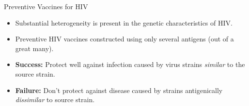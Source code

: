\documentclass[12pt,t,handout]{beamer}
\begin{document}
\begin{frame}[c]{Preventive Vaccines for HIV}

\begin{center}
\begin{itemize}
  \itemsep10pt
  \item Substantial heterogeneity is present in the genetic characteristics of
    HIV.
  \item Preventive HIV vaccines constructed using only several antigens (out of
    a great many).
  \item \textbf{Success:} Protect well against infection caused by virus strains
    \textit{similar} to the source strain.
  \item \textbf{Failure:} Don't protect against disease caused by strains
    antigenically \textit{dissimilar} to source strain.
\end{itemize}
\end{center}


\end{frame}

\end{document}
